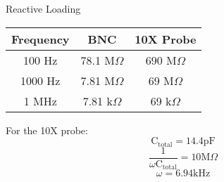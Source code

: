 \documentclass[12pt,letterpaper]{report}
\begin{document}
\begin{center}
Reactive Loading\\
	\begin{tabular}{| c | c | c |}
	\hline
	
	Frequency & BNC & 10X Probe \\
	\hline
	100 Hz & 78.1 M$\Omega$ & 690 M$\Omega$\\
	1000 Hz & 7.81 M$\Omega$ & 69 M$\Omega$\\
	1 MHz & 7.81 k$\Omega$ & 69 k$\Omega$\\
	
	\hline
	\end{tabular}
\end{center}

For the 10X probe:
$$\text{C}_{\text{total}} = 14.4 \text{pF}$$
$$ \frac{1}{\omega \text{C}_{\text{total}}} = 10\text{M}\Omega$$
$$ \omega = 6.94 \text{kHz} $$

%
%
%
%
%
%
\end{document}
